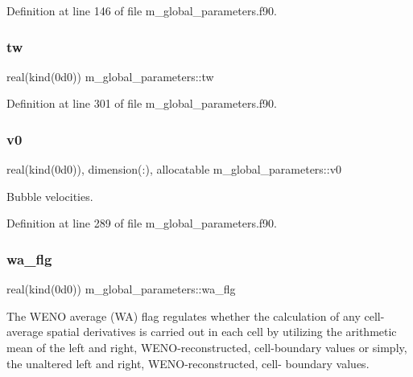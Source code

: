 Definition at line 146 of file m\+\_\+global\+\_\+parameters.\+f90.

\mbox{\label{namespacem__global__parameters_aa77b0836fe22478b69e10e656ef7fcc2}} 
\subsubsection{\texorpdfstring{tw}{tw}}
{\footnotesize\ttfamily real(kind(0d0)) m\+\_\+global\+\_\+parameters\+::tw}



Definition at line 301 of file m\+\_\+global\+\_\+parameters.\+f90.

\mbox{\label{namespacem__global__parameters_a334b440356a4353d073c43e68c2372da}} 
\subsubsection{\texorpdfstring{v0}{v0}}
{\footnotesize\ttfamily real(kind(0d0)), dimension(\+:), allocatable m\+\_\+global\+\_\+parameters\+::v0}



Bubble velocities. 



Definition at line 289 of file m\+\_\+global\+\_\+parameters.\+f90.

\mbox{\label{namespacem__global__parameters_ac4851cbb47e6541bfcf40706bd08eee6}} 
\subsubsection{\texorpdfstring{wa\+\_\+flg}{wa\_flg}}
{\footnotesize\ttfamily real(kind(0d0)) m\+\_\+global\+\_\+parameters\+::wa\+\_\+flg}



The W\+E\+NO average (WA) flag regulates whether the calculation of any cell-\/ average spatial derivatives is carried out in each cell by utilizing the arithmetic mean of the left and right, W\+E\+N\+O-\/reconstructed, cell-\/boundary values or simply, the unaltered left and right, W\+E\+N\+O-\/reconstructed, cell-\/ boundary values. 



